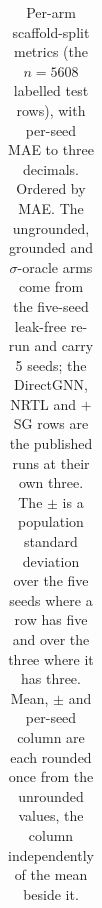 \begin{table}[h]
\centering
\caption[Per-arm scaffold-split metrics]{Per-arm scaffold-split metrics (the $n{=}5608$ labelled test rows), with per-seed
MAE to three decimals. Ordered by MAE. The ungrounded, grounded and $\sigma$-oracle arms come from
the five-seed leak-free re-run and carry 5 seeds; the DirectGNN, NRTL and $+$SG rows are the
published runs at their own three. The $\pm$ is a population standard deviation over the five
seeds where a row has five and over the three where it has three. Mean, $\pm$ and per-seed column are each rounded once from the unrounded values, the column
independently of the mean beside it.}
\label{tab:si-arms}
{\small
\begin{tabular}{lrrl}
\toprule

\bottomrule
\end{tabular}}
\end{table}

